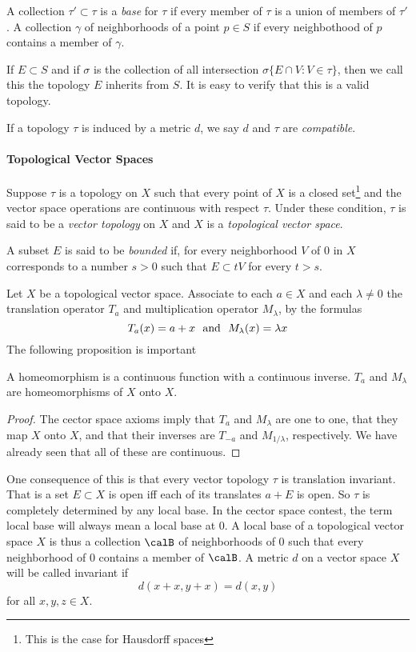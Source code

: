 A collection $\tau'\subset \tau$ is a \emph{base} for $\tau$ if every member of $\tau$ is a union of members of $\tau'$. A collection $\gamma$ of neighborhoods of a point $p\in S$ if every neighbothood of $p$ contains a member of $\gamma$. 

If $E\subset S$ and if $\sigma$ is the collection of all intersection $\sigma\{E \cap V: V \in \tau\}$, then we call this the topology $E$ inherits from $S$. It is easy to verify that this is a valid topology. 

If a topology $\tau$ is induced by a metric $d$, we say $d$ and $\tau$ are \emph{compatible}. 

\paragraph{Topological Vector Spaces}

Suppose $\tau$ is a topology on $X$ such that every point of $X$ is a closed set\footnote{This is the case for Hausdorff spaces} and the vector space operations are continuous with respect $\tau$. Under these condition, $\tau$ is said to be a \emph{vector topology} on $X$ and $X$ is a \emph{topological vector space}. 

A subset $E$ is said to be \emph{bounded} if, for every neighborhood $V$ of $0$ in $X$ corresponds to a number $s > 0$ such that $E \subset tV$ for every $t > s$. 

Let $X$ be a topological vector space. Associate to each $a\in X$ and each $\lambda \neq 0$ the translation operator $T_a$ and multiplication operator $M_\lambda$, by the formulas 
\[T_a(x) = a + x \hbox{ }\text{ and }\hbox{ } M_\lambda(x) = \lambda x\]
The following proposition is important 
\begin{prop}
	A homeomorphism is a continuous function with a continuous inverse. $T_a$ and $M_\lambda$ are homeomorphisms of $X$ onto $X$. 
\end{prop}
\begin{proof}
	The cector space axioms imply that $T_a$ and $M_\lambda$ are one to one, that they map $X$ onto $X$, and that their inverses are $T_{-a}$ and $M_{1/\lambda}$, respectively. We have already seen that all of these are continuous.
\end{proof}

One consequence of this is that every vector topology $\tau$ is translation invariant. That is a set $E\subset X$ is open iff each of its translates $a + E$ is open. So $\tau$ is completely determined by any local base. In the cector space contest, the term local base will always mean a local base at $0$. A local base of a topological vector space $X$ is thus a collection $\calB$ of neighborhoods of 0 such that every neighborhood of 0 contains a member of $\calB$. A metric $d$ on a vector space $X$ will be called invariant if 
\[d(x+x, y+x) = d(x,y)\]
for all $x,y,z\in X$.

